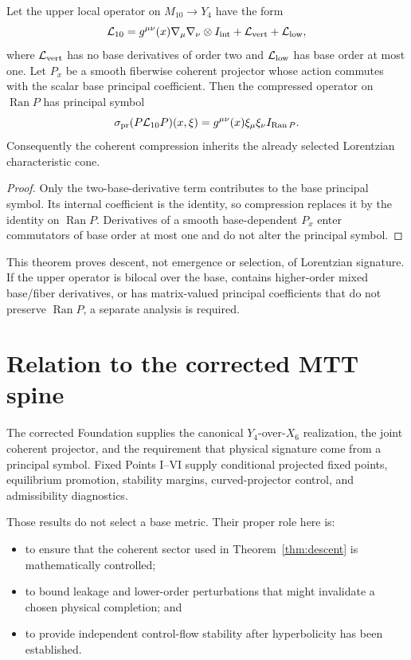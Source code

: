\documentclass[11pt]{article}
\begin{document}
\begin{theorem}\label{thm:descent}
Let the upper local operator on $M_{10}\to Y_4$ have the form
\[
 \mathcal L_{10}
 =g^{\mu\nu}(x)\nabla_\mu\nabla_\nu\otimes I_{\rm int}
 +\mathcal L_{\rm vert}+\mathcal L_{\rm low},
\]
where $\mathcal L_{\rm vert}$ has no base derivatives of order two and
$\mathcal L_{\rm low}$ has base order at most one. Let $P_x$ be a smooth
fiberwise coherent projector whose action commutes with the scalar base
principal coefficient. Then the compressed operator on $\operatorname{Ran}P$
has principal symbol
\[
 \sigma_{\rm pr}(P\mathcal L_{10}P)(x,\xi)
 =g^{\mu\nu}(x)\xi_\mu\xi_\nu I_{\operatorname{Ran}P}.
\]
Consequently the coherent compression inherits the already selected
Lorentzian characteristic cone.
\end{theorem}

\begin{proof}
Only the two-base-derivative term contributes to the base principal symbol.
Its internal coefficient is the identity, so compression replaces it by the
identity on $\operatorname{Ran}P$. Derivatives of a smooth base-dependent $P_x$
enter commutators of base order at most one and do not alter the principal
symbol.
\end{proof}

This theorem proves descent, not emergence or selection, of Lorentzian
signature. If the upper operator is bilocal over the base, contains
higher-order mixed base/fiber derivatives, or has matrix-valued principal
coefficients that do not preserve $\operatorname{Ran}P$, a separate analysis
is required.

\section{Relation to the corrected MTT spine}

The corrected Foundation supplies the canonical $Y_4$-over-$X_6$ realization,
the joint coherent projector, and the requirement that physical signature
come from a principal symbol. Fixed Points I--VI supply conditional projected
fixed points, equilibrium promotion, stability margins, curved-projector
control, and admissibility diagnostics.

Those results do not select a base metric. Their proper role here is:
\begin{itemize}
\item to ensure that the coherent sector used in
Theorem~\ref{thm:descent} is mathematically controlled;
\item to bound leakage and lower-order perturbations that might invalidate a
chosen physical completion; and
\item to provide independent control-flow stability after hyperbolicity has
been established.
\end{itemize}
\end{document}
